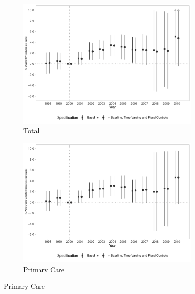 \begin{figure}[h!]
    \begin{center}
    \caption{Effects on Ambulatorial Production}\label{fig:15}
    \begin{subfigure}{0.32\textwidth}
        \centering
        \caption{\scriptsize Total}\label{fig:15a}
        \includegraphics[width=\textwidth]{plots/sia_pcapita_dist_ec29_baseline_dist_ec29_baseline_15.pdf}
    \end{subfigure}
    \begin{subfigure}{0.32\textwidth}
        \centering
        \caption{\scriptsize Primary Care}\label{fig:15b}
        \includegraphics[width=\textwidth]{plots/sia_ab_pcapita_dist_ec29_baseline_dist_ec29_baseline_15.pdf}
    \end{subfigure}

\end{center}
\end{figure}
